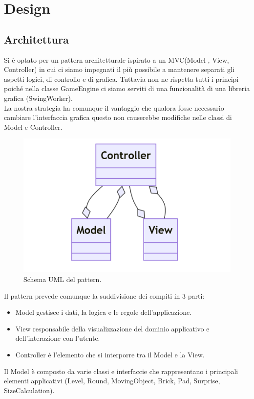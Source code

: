 \documentclass[a4paper,12pt]{report}
\begin{document}
\chapter{Design}
\section{Architettura}
Si è optato per un pattern architetturale ispirato a un MVC(Model , View, Controller) in cui ci siamo impegnati il più
possibile a mantenere separati gli aspetti logici, di controllo e di grafica. Tuttavia non ne rispetta tutti i principi poiché nella classe GameEngine ci siamo
serviti di una funzionalità di una libreria grafica (SwingWorker).
\\La nostra strategia ha comunque il vantaggio che qualora fosse necessario cambiare l'interfaccia grafica
questo non causerebbe modifiche nelle classi di Model e Controller.
\begin{figure}[H]
    \centering{}
    \includegraphics[scale=0.5]{images/MVC.png}
    \caption{Schema UML del pattern.}
    \label{images:MVC}
\end{figure}
Il pattern prevede comunque la suddivisione dei compiti in 3 parti:
\begin{itemize}
  \item Model gestisce i dati, la logica e le regole dell'applicazione.
  \item View responsabile della visualizzazione del dominio applicativo e dell'interazione con l'utente.
  \item Controller è l'elemento che si interporre tra il Model e la View.
\end{itemize}
Il Model è composto da varie classi e interfaccie che rappresentano i principali elementi applicativi (Level, Round, MovingObject, Brick, Pad, Surprise, SizeCalculation).
\end{document}

